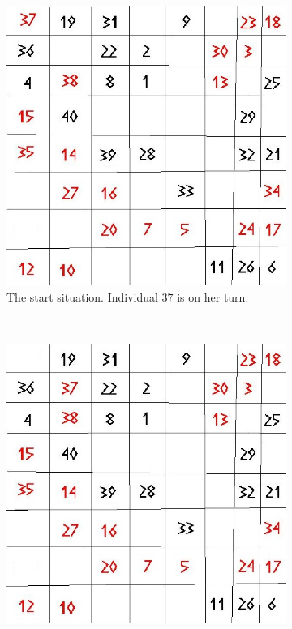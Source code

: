 \begin{figure}[H]
    \centering
    \begin{subfigure}{0.3\textwidth}
        \includegraphics[width=\textwidth]{Tegenvoorbeeld/segregation_tegenvb.jpg}
        \caption{The start situation. Individual $37$ is on her turn.}
        \label{fig:movement1}
    \end{subfigure}\hspace{1cm}
    ~ %
    \begin{subfigure}{0.3\textwidth}
        \includegraphics[width=\textwidth]{Tegenvoorbeeld/segregation_tegenvb_1.jpg}

\end{subfigure}
\end{figure}
